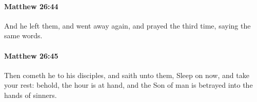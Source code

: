 		\paragraph{Matthew 26:44} %
			\label{MATTHEW-26-44}

			And he left them, and went away again, and prayed the third time, saying the same words.

			\begin{framed}
			\scriptsize
				\begin{compactdesc}
					\item[SBLG] 
				\end{compactdesc}
			\end{framed}

		\paragraph{Matthew 26:45} %
			\label{MATTHEW-26-45}

			Then cometh he to his disciples, and saith unto them, Sleep on now, and take your rest: behold, the hour is at hand, and the Son of man is betrayed into the hands of sinners.

